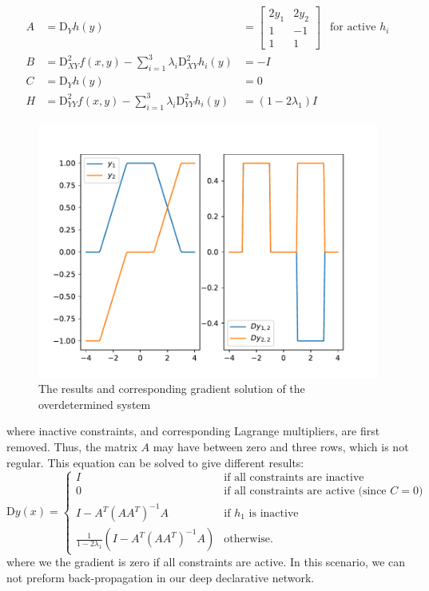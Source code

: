 $$
\begin{array}{llll}
    A &= \text{D}_{Y} h(y) &= \begin{bmatrix}
         2 y_1 & 2 y_2 \\ 1 & -1 \\ 1 & 1
         \end{bmatrix} & \text{for active $h_i$} \\
    B &= \text{D}^2_{XY} f(x, y) - \sum_{i=1}^{3} \lambda_i \text{D}^2_{XY} h_i(y) &= -I \\
    C &= \text{D}_{Y} h(y) &= 0 \\
    H &= \text{D}^2_{YY} f(x, y) - \sum_{i=1}^{3} \lambda_i \text{D}^2_{YY} h_i(y) &= (1 - 2 \lambda_1) I 
\end{array}
$$
\begin{figure}[t]
    \label{fig:overdetermined-gradient}
    \centering
    \includegraphics[page=1, width=.8\textwidth]{figs/overdetermined-gradient.pdf}
    \caption{The results and corresponding gradient solution of the overdetermined system}
\end{figure}
where inactive constraints, and corresponding Lagrange multipliers, are first removed. Thus, the matrix $A$ may have between zero and three rows, which is not regular. This equation can be solved to give different results: 
$$
\text{D} y(x) = \begin{cases}
        I & \text{if all constraints are inactive} \\
        0 & \text{if all constraints are active (since $C = 0$)} \\
        I - A^T (AA^T)^{-1} A & \text{if $h_1$ is inactive} \\
        \frac{1}{1 - 2 \lambda_1} \left(I - A^T (AA^T)^{-1} A\right) & \text{otherwise.}
    \end{cases}
$$
where we the gradient is zero if all constraints are active. In this scenario, we can not preform back-propagation in our deep declarative network. 

